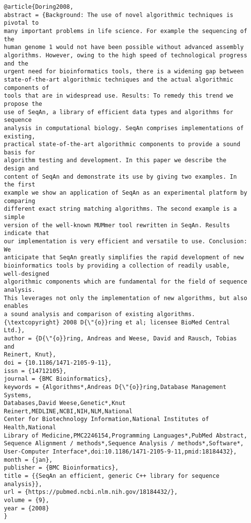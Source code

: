 \documentclass[]{article}
\begin{document}
\begin{verbatim}
@article{Doring2008,
abstract = {Background: The use of novel algorithmic techniques is pivotal to
many important problems in life science. For example the sequencing of the
human genome 1 would not have been possible without advanced assembly
algorithms. However, owing to the high speed of technological progress and the
urgent need for bioinformatics tools, there is a widening gap between
state-of-the-art algorithmic techniques and the actual algorithmic components of
tools that are in widespread use. Results: To remedy this trend we propose the
use of SeqAn, a library of efficient data types and algorithms for sequence
analysis in computational biology. SeqAn comprises implementations of existing,
practical state-of-the-art algorithmic components to provide a sound basis for
algorithm testing and development. In this paper we describe the design and
content of SeqAn and demonstrate its use by giving two examples. In the first
example we show an application of SeqAn as an experimental platform by comparing
different exact string matching algorithms. The second example is a simple
version of the well-known MUMmer tool rewritten in SeqAn. Results indicate that
our implementation is very efficient and versatile to use. Conclusion: We
anticipate that SeqAn greatly simplifies the rapid development of new
bioinformatics tools by providing a collection of readily usable, well-designed
algorithmic components which are fundamental for the field of sequence analysis.
This leverages not only the implementation of new algorithms, but also enables
a sound analysis and comparison of existing algorithms.
{\textcopyright} 2008 D{\"{o}}ring et al; licensee BioMed Central Ltd.},
author = {D{\"{o}}ring, Andreas and Weese, David and Rausch, Tobias and
Reinert, Knut},
doi = {10.1186/1471-2105-9-11},
issn = {14712105},
journal = {BMC Bioinformatics},
keywords = {Algorithms*,Andreas D{\"{o}}ring,Database Management Systems,
Databases,David Weese,Genetic*,Knut Reinert,MEDLINE,NCBI,NIH,NLM,National
Center for Biotechnology Information,National Institutes of Health,National
Library of Medicine,PMC2246154,Programming Languages*,PubMed Abstract,
Sequence Alignment / methods*,Sequence Analysis / methods*,Software*,
User-Computer Interface*,doi:10.1186/1471-2105-9-11,pmid:18184432},
month = {jan},
publisher = {BMC Bioinformatics},
title = {{SeqAn an efficient, generic C++ library for sequence analysis}},
url = {https://pubmed.ncbi.nlm.nih.gov/18184432/},
volume = {9},
year = {2008}
}
\end{verbatim}
\end{document}
